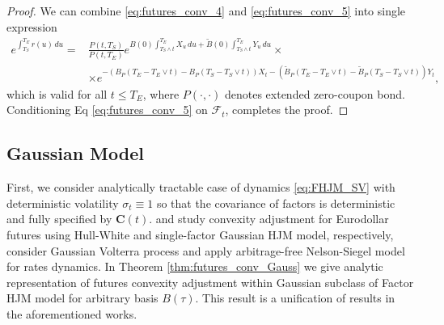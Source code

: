 \documentclass[pdftex,11pt,a4paper] {article}
\begin{document}
\begin{proof}
We can combine \eqref{eq:futures_conv_4} and \eqref{eq:futures_conv_5} into single expression
\begin{equation}\label{eq:futures_conv_5a}
\begin{split}
e^{\int_{T_S}^{T_E}r(u)\,du}=&\frac{P(t,T_S)}{P(t,T_E)}e^{B(0)\int_{T_S\wedge t}^{T_E}X_u\,du+\tilde B(0)\int_{T_S\wedge t}^{T_E}Y_u\,du}\times\\
&\times e^{-\left(B_P(T_E-T_E\vee t)-B_P(T_S-T_S\vee t)\right) X_{t}-\left(\tilde B_P(T_E-T_E\vee t)-\tilde B_P(T_S-T_S\vee t)\right) Y_{t}},
\end{split}
\end{equation}
which is valid for all $t\le T_E$, where $P(\cdot,\cdot)$ denotes extended zero-coupon bond. Conditioning Eq \eqref{eq:futures_conv_5} on $\mathcal{F}_t$, completes the proof. 

\end{proof}





\subsection{Gaussian Model}

First, we consider analytically tractable case of dynamics \eqref{eq:FHJM_SV} with deterministic  volatility $\sigma_t\equiv 1$ so that the covariance of factors is deterministic and fully specified by $\mathbf{C}(t)$. \cite{KirikosNovak1992} and \cite{Henrard2005} study convexity adjustment for Eurodollar futures using Hull-White and single-factor Gaussian HJM model, respectively, \cite{Jacquier2023} consider Gaussian Volterra process and \cite{Skov2021} apply arbitrage-free Nelson-Siegel model for rates dynamics. In Theorem \ref{thm:futures_conv_Gauss} we give analytic representation of futures convexity adjustment within Gaussian subclass of Factor HJM model for arbitrary basis $B(\tau)$. This result is a unification of results in the aforementioned works. 
\end{document}
